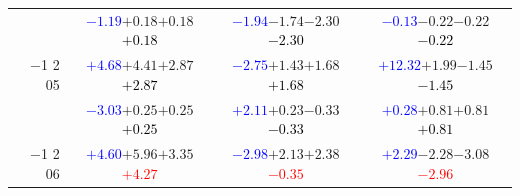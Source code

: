 \documentclass[compress]{beamer}
\begin{document}
\begin{frame}
\begin{tabular}{r | c | c | c}
          & \textcolor{blue}{$-1.19$}\hspace{0.1 cm}$+0.18$\hspace{0.1 cm}$+0.18$\hspace{0.1 cm}\textcolor{black}{$+0.18$} & \textcolor{blue}{$-1.94$}\hspace{0.1 cm}$-1.74$\hspace{0.1 cm}$-2.30$\hspace{0.1 cm}\textcolor{black}{$-2.30$} & \textcolor{blue}{$-0.13$}\hspace{0.1 cm}$-0.22$\hspace{0.1 cm}$-0.22$\hspace{0.1 cm}\textcolor{black}{$-0.22$} \\
$-$1 2 05 & \textcolor{blue}{$+4.68$}\hspace{0.1 cm}$+4.41$\hspace{0.1 cm}$+2.87$\hspace{0.1 cm}\textcolor{black}{$+2.87$} & \textcolor{blue}{$-2.75$}\hspace{0.1 cm}$+1.43$\hspace{0.1 cm}$+1.68$\hspace{0.1 cm}\textcolor{black}{$+1.68$} & \textcolor{blue}{$+12.32$}\hspace{0.1 cm}$+1.99$\hspace{0.1 cm}$-1.45$\hspace{0.1 cm}\textcolor{black}{$-1.45$} \\
          & \textcolor{blue}{$-3.03$}\hspace{0.1 cm}$+0.25$\hspace{0.1 cm}$+0.25$\hspace{0.1 cm}\textcolor{black}{$+0.25$} & \textcolor{blue}{$+2.11$}\hspace{0.1 cm}$+0.23$\hspace{0.1 cm}$-0.33$\hspace{0.1 cm}\textcolor{black}{$-0.33$} & \textcolor{blue}{$+0.28$}\hspace{0.1 cm}$+0.81$\hspace{0.1 cm}$+0.81$\hspace{0.1 cm}\textcolor{black}{$+0.81$} \\
$-$1 2 06 & \textcolor{blue}{$+4.60$}\hspace{0.1 cm}$+5.96$\hspace{0.1 cm}$+3.35$\hspace{0.1 cm}\textcolor{red}{$+4.27$} & \textcolor{blue}{$-2.98$}\hspace{0.1 cm}$+2.13$\hspace{0.1 cm}$+2.38$\hspace{0.1 cm}\textcolor{red}{$-0.35$} & \textcolor{blue}{$+2.29$}\hspace{0.1 cm}$-2.28$\hspace{0.1 cm}$-3.08$\hspace{0.1 cm}\textcolor{red}{$-2.96$} \\

\end{tabular}
\end{frame}
\end{document}
